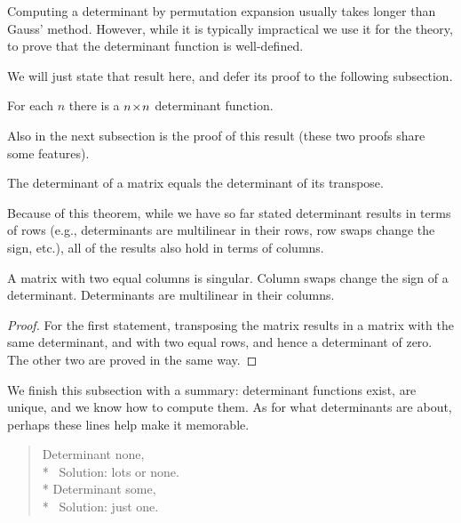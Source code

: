 Computing a determinant by permutation expansion usually takes longer than
Gauss' method.
However, 
while it is typically impractical
we use it for the theory, to prove that 
the determinant function is well-defined.

We will just state that result here, and 
defer its proof to the following subsection.


\begin{theorem}
 \label{th:DetsExist}
For each $n$ there is a $n \! \times \! n$ determinant function.
\end{theorem}

Also in the next subsection is the proof of this
result (these two proofs share some features).

\begin{theorem}
The determinant of a matrix equals the determinant of its transpose.
\end{theorem}

Because of this theorem,
while we have so far stated determinant results in terms of rows
(e.g., determinants are multilinear in their rows, row swaps change the
sign, etc.),
all of the results also hold in terms of columns.

\begin{corollary} \label{cor:ColSwapChgSign} \label{cor:DetsMultiInCols}
  A matrix with two equal columns is singular.
  Column swaps change the sign of a determinant.
  Determinants are multilinear in their columns.
\end{corollary}

\begin{proof}
For the first statement, 
transposing the matrix results in a matrix with the same determinant,
and with two equal rows, and hence a determinant of zero.
The other two are proved in the same way.
\end{proof}

We finish this subsection with a summary:
determinant functions exist, are unique, and we know how to compute them.
As for what determinants are about, perhaps these lines
\cite{Kemp} help make it memorable.
\begin{verse} \small
Determinant none,         \\*
\ Solution: lots or none.   \\*
Determinant some,         \\*
\ Solution: just one.
\end{verse}




